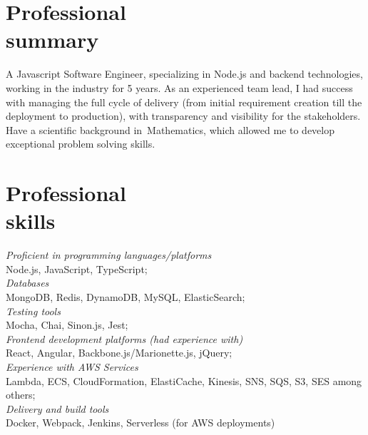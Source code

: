 \documentclass[margin, 10pt]{res} %
\begin{document}
\begin{resume}
\vspace*{-0.5cm}
\section{Professional\\ summary}
A Javascript Software Engineer, specializing in Node.js and backend technologies, working in the industry for 5 years.
As an experienced team lead, I had success with managing the full cycle of delivery (from initial requirement creation till the deployment to production), with transparency and visibility for the stakeholders.
Have a scientific background in~Mathematics, which allowed me to develop exceptional problem solving skills.

\section{Professional\\ skills}
{\sl  Proficient in programming languages/platforms}  \\
\-\hspace{0.5cm} Node.js, JavaScript, TypeScript;\\
{\sl Databases }\\
\-\hspace{0.5cm} MongoDB, Redis, DynamoDB, MySQL, ElasticSearch; \\
{\sl Testing tools }\\
\-\hspace{0.5cm} Mocha, Chai, Sinon.js, Jest; \\
{\sl Frontend development platforms (had experience with) }\\
\-\hspace{0.5cm} React, Angular,  Backbone.js/Marionette.js, jQuery;\\
{\sl Experience with AWS Services } \\
\-\hspace{0.5cm}  Lambda, ECS, CloudFormation, ElastiCache, Kinesis, SNS, SQS, S3, SES among others; \\
{\sl Delivery and build tools } \\
\-\hspace{0.5cm} Docker, Webpack, Jenkins, Serverless (for AWS deployments)


\end{resume}
\end{document}
